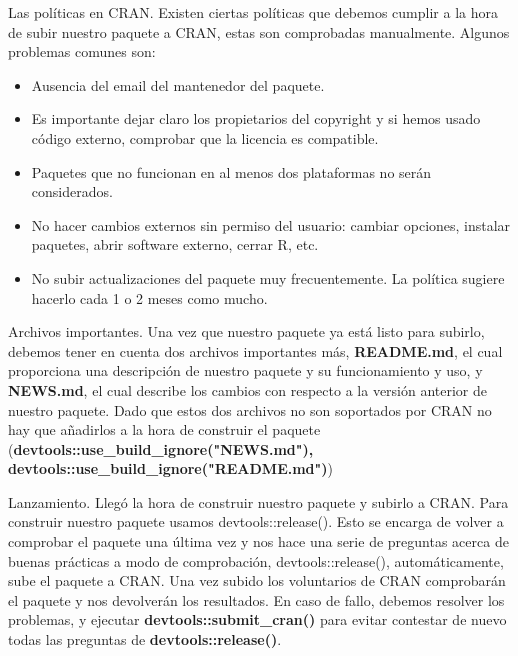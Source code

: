Las pol\'iticas en CRAN.
Existen ciertas pol\'iticas que debemos cumplir a la hora de subir nuestro paquete a CRAN,
estas son comprobadas manualmente.
Algunos problemas comunes son:
\begin{itemize}
    \item Ausencia del email del mantenedor del paquete. 
    \item Es importante dejar claro los propietarios del copyright y si hemos usado c\'odigo
externo, comprobar que la licencia es compatible.
    \item Paquetes que no funcionan en al menos dos plataformas no ser\'an considerados.
    \item No hacer cambios externos sin permiso del usuario: cambiar opciones, instalar
paquetes, abrir software externo, cerrar R, etc.
    \item No subir actualizaciones del paquete muy frecuentemente. La pol\'itica sugiere hacerlo
cada 1 o 2 meses como mucho.
\end{itemize}

Archivos importantes.
Una vez que nuestro paquete ya est\'a listo para subirlo, debemos tener en cuenta dos archivos
importantes m\'as,\textbf{ README.md}, el cual proporciona una descripci\'on de nuestro paquete y su
funcionamiento y uso, y \textbf{NEWS.md}, el cual describe los cambios con respecto a la versi\'on
anterior de nuestro paquete. Dado que estos dos archivos no son soportados por CRAN no
hay que a\~nadirlos a la hora de construir el paquete (\textbf{devtools::use\_build\_ignore("NEWS.md"),
devtools::use\_build\_ignore("README.md")})

Lanzamiento.
Lleg\'o la hora de construir nuestro paquete y subirlo a CRAN. Para construir nuestro paquete
usamos devtools::release(). Esto se encarga de volver a comprobar el paquete una \'ultima
vez y nos hace una serie de preguntas acerca de buenas pr\'acticas a modo de comprobaci\'on,
devtools::release(), autom\'aticamente, sube el paquete a CRAN.
Una vez subido los voluntarios de CRAN comprobar\'an el paquete y nos
devolver\'an los resultados.
En caso de fallo, debemos resolver los problemas, y ejecutar \textbf{devtools::submit\_cran()} para evitar contestar de nuevo todas las preguntas de
\textbf{devtools::release()}.

\newpage